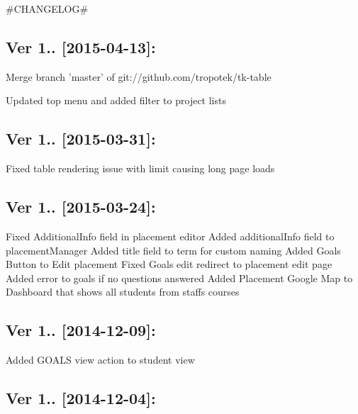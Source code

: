 \#\+C\+H\+A\+N\+G\+E\+L\+O\+G\#

\subsection*{Ver 1.. \mbox{[}2015-\/04-\/13\mbox{]}\+: }


\begin{DoxyItemize}
\item Merge branch 'master' of git\+://github.com/tropotek/tk-\/table
\item Updated top menu and added filter to project lists
\end{DoxyItemize}

\subsection*{Ver 1.. \mbox{[}2015-\/03-\/31\mbox{]}\+: }


\begin{DoxyItemize}
\item Fixed table rendering issue with limit causing long page loads
\end{DoxyItemize}

\subsection*{Ver 1.. \mbox{[}2015-\/03-\/24\mbox{]}\+: }


\begin{DoxyItemize}
\item Fixed Additional\+Info field in placement editor Added additional\+Info field to placement\+Manager Added title field to term for custom naming Added Goals Button to Edit placement Fixed Goals edit redirect to placement edit page Added error to goals if no questions answered Added Placement Google Map to Dashboard that shows all students from staffs courses
\end{DoxyItemize}

\subsection*{Ver 1.. \mbox{[}2014-\/12-\/09\mbox{]}\+: }


\begin{DoxyItemize}
\item Added G\+O\+A\+L\+S view action to student view
\end{DoxyItemize}

\subsection*{Ver 1.. \mbox{[}2014-\/12-\/04\mbox{]}\+: }


